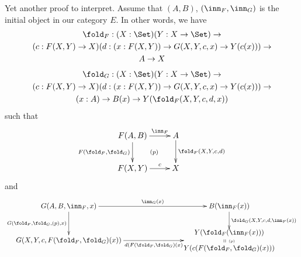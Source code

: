 \documentclass{article}
\begin{document}
Yet another proof to interpret. Assume that $(A, B)$, $(\inn_F,
\inn_G)$ is the initial object in our category $E$. In other words, we
have
\begin{multline*}
  \fold_F : (X : \Set)(Y : X \to \Set) \to \\
  (c : F(X, Y) \to X)(d : (x : F(X, Y)) \to G(X, Y, c, x) \to Y(c(x))) \to \\
  A \to X
\end{multline*}
\begin{multline*}
  \fold_G : (X : \Set)(Y : X \to \Set) \to \\
  (c : F(X, Y) \to X)(d : (x : F(X, Y)) \to G(X, Y, c, x) \to Y(c(x))) \to \\
  (x : A) \to B(x) \to Y(\fold_F(X, Y, c, d, x))
\end{multline*}
such that
\[
\xymatrix{
F(A, B) \ar^-{\inn_F}[r] \ar_-{F(\fold_F, \fold_G)}[d] & A \ar^-{\fold_F(X, Y, c, d)}[d] \\
F(X, Y) \ar^-{c}[r]  & X \ar@{}|{(p)}[ul]
}
\]
and
\[
\xymatrix{
G(A, B, \inn_F, x) \ar^-{\inn_G(x)}[rrr] \ar_-{G(\fold_F, \fold_G, (p), x)}[d]&&& B(\inn_F(x)) \ar^-{\fold_G(X, Y, c, d, \inn_F(x))}[d] \\
G(X, Y, c, F(\fold_F, \fold_G)(x)) \ar_-{d(F(\fold_F, \fold_G)(x)}[rrr]&&& *\txt{$Y(\fold_F(\inn_F(x)))$ \\ $\shortparallel$ {\tiny ($p$)} \\ $Y(c(F(\fold_F, \fold_G)(x)))$}
}
\]
\end{document}
